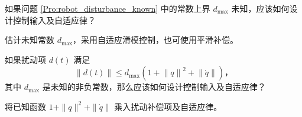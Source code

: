 \begin{problem}\label{Pro:robot_disturbance_unknown}
    如果问题 \ref{Pro:robot_disturbance_known} 中的常数上界 $d_{\mathrm{max}}$ 未知，应该如何设计控制输入及自适应律？
\end{problem}
\begin{hint}
    估计未知常数 $d_{\mathrm{max}}$，采用自适应滑模控制，也可使用平滑补偿。
\end{hint}

\begin{problem}\label{Pro:robot_disturbance_state}
    如果扰动项 $d(t)$ 满足
    \[
        \| d(t) \| \leq d_{\mathrm{max}} (1 + {\| q \|}^2 + {\| \dot{q} \|}) \text{，}
    \]
    其中 $d_{\mathrm{max}}$ 是未知的非负常数，那么应该如何设计控制输入及自适应律？
\end{problem}
\begin{hint}
    将已知函数 $1+\|q\|^2+\|\dot{q}\|$ 乘入扰动补偿项及自适应律。
\end{hint}
